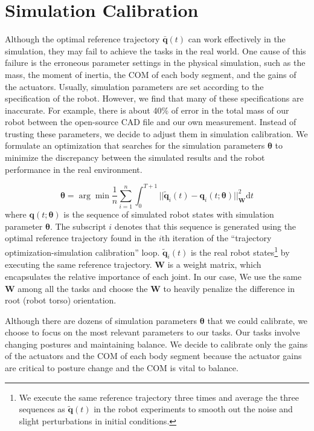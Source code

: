 \section{Simulation Calibration}

Although the optimal reference trajectory $\bar{\mathbf{q}}(t)$ can work effectively in the simulation, they may fail to achieve the tasks in the real world. One cause of this failure is the erroneous parameter settings in the physical simulation, such as the mass, the moment of inertia, the COM of each body segment, and the gains of the actuators. Usually, simulation parameters are set according to the specification of the robot. However, we find that many of these specifications are inaccurate. For example, there is about 40\% of error in the total mass of our robot between the open-source CAD file and our own measurement. Instead of trusting these parameters, we decide to adjust them in simulation calibration. We formulate an optimization that searches for the simulation parameters $\boldsymbol{\theta}$ to minimize the discrepancy between the simulated results and the robot performance in the real environment.

\begin{equation}
\boldsymbol{\theta}=\arg\min\frac{1}{n}\sum_{i=1}^{n}\int_{0}^{T+1}||\tilde{\mathbf{q}}_i(t)-\mathbf{q}_i(t;\boldsymbol{\theta})||_{\mathbf{W}}^2\mathrm{d}t
  \label{eqn:calibrationObj}
\end{equation}
where $\mathbf{q}(t;\boldsymbol{\theta})$ is the sequence of simulated robot states with simulation parameter $\boldsymbol{\theta}$. The subscript $i$ denotes that this sequence is generated using the optimal reference trajectory found in the $i$th iteration of the ``trajectory optimization-simulation calibration'' loop. $\tilde{\mathbf{q}}_i(t)$ is the real robot states\footnote{We execute the same reference trajectory three times and average the three sequences as $\tilde{\mathbf{q}}(t)$ in the robot experiments to smooth out the noise and slight perturbations in initial conditions.} by executing the same reference trajectory. $\mathbf{W}$ is a weight matrix, which encapsulates the relative importance of each joint. In our case, We use the same $\mathbf{W}$ among all the tasks and choose the $\mathbf{W}$ to heavily penalize the difference in root (robot torso) orientation. 

Although there are dozens of simulation parameters $\boldsymbol{\theta}$ that we could calibrate, we choose to focus on the most relevant parameters to our tasks. Our tasks involve changing postures and maintaining balance. We decide to calibrate only the gains of the actuators and the COM of each body segment because the actuator gains are critical to posture change and the COM is vital to balance.

